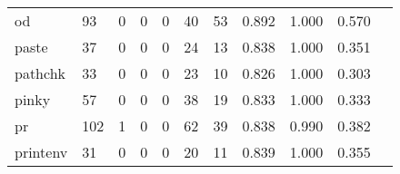 \begin{longtable}{lp{1.2cm}p{1.2cm}p{1.2cm}p{1.2cm}p{1.2cm}p{1.2cm}p{1.2cm}p{1.2cm}p{1.2cm}p{1.2cm}}
od        &                                    93 &                                                  0 &                                                  0 &                                                  0 &                                                 40 &                                                 53 &                                              0.892 &                                              1.000 &                                              0.570 \\
paste     &                                    37 &                                                  0 &                                                  0 &                                                  0 &                                                 24 &                                                 13 &                                              0.838 &                                              1.000 &                                              0.351 \\
pathchk   &                                    33 &                                                  0 &                                                  0 &                                                  0 &                                                 23 &                                                 10 &                                              0.826 &                                              1.000 &                                              0.303 \\
pinky     &                                    57 &                                                  0 &                                                  0 &                                                  0 &                                                 38 &                                                 19 &                                              0.833 &                                              1.000 &                                              0.333 \\
pr        &                                   102 &                                                  1 &                                                  0 &                                                  0 &                                                 62 &                                                 39 &                                              0.838 &                                              0.990 &                                              0.382 \\
printenv  &                                    31 &                                                  0 &                                                  0 &                                                  0 &                                                 20 &                                                 11 &                                              0.839 &                                              1.000 &                                              0.355 \\

\end{longtable}
